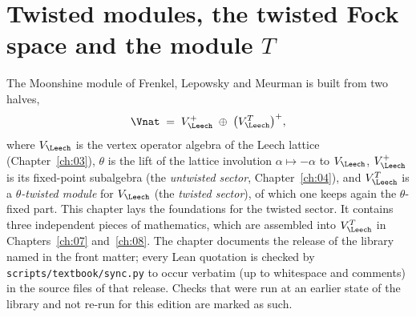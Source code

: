 \chapter{Twisted modules, the twisted Fock space and the module \texorpdfstring{$T$}{T}}\label{ch:06}
\begingroup\sloppy

\providecommand{\chsixS}{S[\theta]}
\providecommand{\chsixeps}{\varepsilon}

The Moonshine module of Frenkel, Lepowsky and Meurman is built from two halves,
\begin{equation*}
  \Vnat \;=\; V_\Leech^{+} \;\oplus\; \bigl(V_\Leech^{T}\bigr)^{+},
\end{equation*}
where $V_\Leech$ is the vertex operator algebra of the Leech lattice (Chapter~\ref{ch:03}),
$\theta$ is the lift of the lattice involution $\alpha\mapsto-\alpha$ to $V_\Leech$, $V_\Leech^+$
is its fixed-point subalgebra (the \emph{untwisted sector}, Chapter~\ref{ch:04}), and
$V_\Leech^T$ is a \emph{$\theta$-twisted module} for $V_\Leech$ (the \emph{twisted sector}), of
which one keeps again the $\theta$-fixed part.  This chapter lays the foundations for the twisted
sector.  It contains three independent pieces of mathematics, which are assembled into
$V_\Leech^T$ in Chapters~\ref{ch:07} and~\ref{ch:08}.  The chapter documents the release of the library named in the front matter; every Lean quotation is checked by \texttt{scripts/textbook/sync.py} to occur verbatim
(up to whitespace and comments) in the source files of that release. Checks that were run at an earlier state of the library and not re-run for this edition are marked as such.

